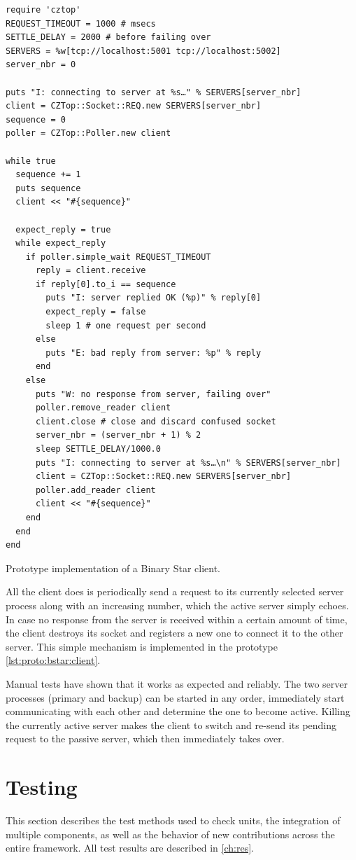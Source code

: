 \begin{listing}[H]
	\begin{verbatim}
require 'cztop'
REQUEST_TIMEOUT = 1000 # msecs
SETTLE_DELAY = 2000 # before failing over
SERVERS = %w[tcp://localhost:5001 tcp://localhost:5002]
server_nbr = 0

puts "I: connecting to server at %s…" % SERVERS[server_nbr]
client = CZTop::Socket::REQ.new SERVERS[server_nbr]
sequence = 0
poller = CZTop::Poller.new client

while true
  sequence += 1
  puts sequence
  client << "#{sequence}"

  expect_reply = true
  while expect_reply
    if poller.simple_wait REQUEST_TIMEOUT
      reply = client.receive
      if reply[0].to_i == sequence
        puts "I: server replied OK (%p)" % reply[0]
        expect_reply = false
        sleep 1 # one request per second
      else
        puts "E: bad reply from server: %p" % reply
      end
    else
      puts "W: no response from server, failing over"
      poller.remove_reader client
      client.close # close and discard confused socket
      server_nbr = (server_nbr + 1) % 2
      sleep SETTLE_DELAY/1000.0
      puts "I: connecting to server at %s…\n" % SERVERS[server_nbr]
      client = CZTop::Socket::REQ.new SERVERS[server_nbr]
      poller.add_reader client
      client << "#{sequence}"
    end
  end
end
	\end{verbatim}
	\caption{Prototype implementation of a Binary Star client.}
	\label{lst:proto:bstar:client}
\end{listing}

All the client does is periodically send a request to its currently selected
server process along with an increasing number, which the active server simply
echoes. In case no response from the server is received within a certain amount
of time, the client destroys its socket and registers a new one to connect it
to the other server. This simple mechanism is implemented in the prototype
\autoref{lst:proto:bstar:client}.


Manual tests have shown that it works as expected and reliably. The two server
processes (primary and backup) can be started in any order, immediately start
communicating with each other and determine the one to become active. Killing
the currently active server makes the client to switch and re-send its pending
request to the passive server, which then immediately takes over.


\section{Testing}\label{sec:approach:testing}
This section describes the test methods used to check units, the integration of
multiple components, as well as the behavior of new contributions across the
entire framework.  All test results are described in \autoref{ch:res}.

